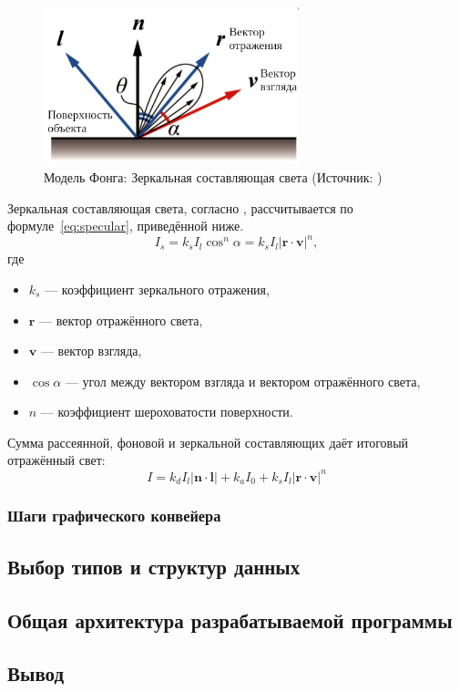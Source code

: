 \begin{figure}[H]
	\centering
	\includegraphics[width=0.66\textwidth]{img/specular_ru}
    \caption{Модель Фонга: Зеркальная составляющая света (Источник: \cite{phong})}
	\label{fig:specular}
\end{figure}

Зеркальная составляющая света, согласно \cite{phong}, рассчитывается по формуле~\ref{eq:specular}, приведённой ниже.
\begin{equation}
    I_s = k_s I_l \cos^n \alpha = k_s I_l \left| \boldsymbol{r} \cdot \boldsymbol{v} \right|^n,
    \label{eq:specular}
\end{equation}
где
\begin{itemize}
    \item $k_s$ --- коэффициент зеркального отражения,
    \item $\boldsymbol{r}$ --- вектор отражённого света,
    \item $\boldsymbol{v}$ --- вектор взгляда,
    \item $\cos \alpha$ --- угол между вектором взгляда и вектором отражённого света,
    \item $n$ --- коэффициент шероховатости поверхности.
\end{itemize}

Сумма рассеянной, фоновой и зеркальной составляющих даёт итоговый отражённый свет:
\begin{equation}
    I = k_d I_l \left| \boldsymbol{n} \cdot \boldsymbol{l} \right| + k_a I_0 + k_s I_l \left| \boldsymbol{r} \cdot \boldsymbol{v} \right|^n
    \label{eq:phong}
\end{equation}

\subsubsection{Шаги графического конвейера}

\subsection{Выбор типов и структур данных}

\subsection{Общая архитектура разрабатываемой программы}


\subsection*{Вывод}

